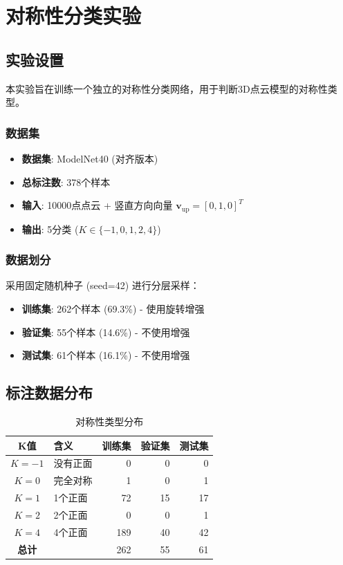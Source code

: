 
\section{对称性分类实验}

\subsection{实验设置}

本实验旨在训练一个独立的对称性分类网络，用于判断3D点云模型的对称性类型。

\subsubsection{数据集}
\begin{itemize}
    \item \textbf{数据集}: ModelNet40 (对齐版本)
    \item \textbf{总标注数}: 378个样本
    \item \textbf{输入}: 10000点点云 + 竖直方向向量 $\mathbf{v}_{\text{up}} = [0, 1, 0]^T$
    \item \textbf{输出}: 5分类 ($K \in \{-1, 0, 1, 2, 4\}$)
\end{itemize}

\subsubsection{数据划分}
采用固定随机种子 (seed=42) 进行分层采样：
\begin{itemize}
    \item \textbf{训练集}: 262个样本 (69.3\%) - 使用旋转增强
    \item \textbf{验证集}: 55个样本 (14.6\%) - 不使用增强
    \item \textbf{测试集}: 61个样本 (16.1\%) - 不使用增强
\end{itemize}

\subsection{标注数据分布}

\begin{table}[h]
\centering
\caption{对称性类型分布}
\label{tab:symmetry_distribution}
\begin{tabular}{clrrr}
\hline
\textbf{K值} & \textbf{含义} & \textbf{训练集} & \textbf{验证集} & \textbf{测试集} \\
\hline
$K=-1$ & 没有正面 & 0 & 0 & 0 \\
$K=0$ & 完全对称 & 1 & 0 & 1 \\
$K=1$ & 1个正面 & 72 & 15 & 17 \\
$K=2$ & 2个正面 & 0 & 0 & 1 \\
$K=4$ & 4个正面 & 189 & 40 & 42 \\
\hline
\textbf{总计} & & 262 & 55 & 61 \\
\hline
\end{tabular}
\end{table}


